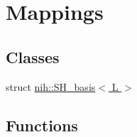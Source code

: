 \hypertarget{group___spherical}{
\section{\-Mappings}
\label{group___spherical}
}
\subsection*{\-Classes}
\begin{DoxyCompactItemize}
\item 
struct \hyperlink{structnih_1_1_s_h__basis}{nih\-::\-S\-H\-\_\-basis$<$ L $>$}
\end{DoxyCompactItemize}
\subsection*{\-Functions}
